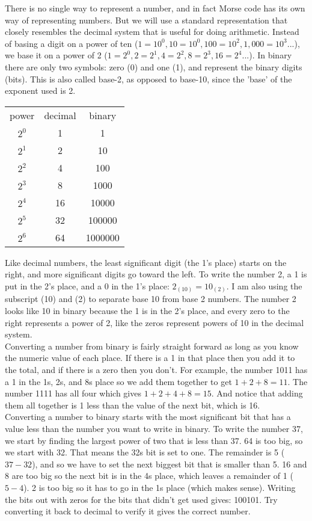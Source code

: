 There is no single way to represent a number, and in fact Morse code has its own way of representing numbers. But we will use a standard representation that closely resembles the decimal system that is useful for doing arithmetic. Instead of basing a digit on a power of ten ($1=10^0, 10=10^0, 100=10^2, 1,000=10^3...$), we base it on a power of 2 ($1=2^0, 2=2^1, 4=2^2, 8=2^3, 16=2^4...$). In binary there are only two symbols: zero (0) and one (1), and represent the binary digits (bits). This is also called base-2, as opposed to base-10, since the 'base' of the exponent used is 2.\\

\begin{center}
\begin{tabular}{c | c | c}
	power & decimal & binary \\
	$2^0$ & 1 & 1 \\
	$2^1$ & 2 & 10 \\
	$2^2$ & 4 & 100 \\
	$2^3$ & 8 & 1000 \\
	$2^4$ & 16 & 10000 \\
	$2^5$ & 32 & 100000 \\
	$2^6$ & 64 & 1000000 \\
\end{tabular}
\end{center}

Like decimal numbers, the least significant digit (the 1's place) starts on the right, and more significant digits go toward the left. To write the number 2, a 1 is put in the 2's place, and a 0 in the 1's place: $2_{(10)} = 10_{(2)}$. I am also using the subscript (10) and (2) to separate base 10 from base 2 numbers. The number 2 looks like 10 in binary because the 1 is in the 2's place, and every zero to the right represents a power of 2, like the zeros represent powers of 10 in the decimal system.\\

Converting a number from binary is fairly straight forward as long as you know the numeric value of each place. If there is a 1 in that place then you add it to the total, and if there is a zero then you don't. For example, the number 1011 has a 1 in the 1s, 2s, and 8s place so we add them together to get $1+2+8=11$. The number 1111 has all four which gives $1+2+4+8 = 15$. And notice that adding them all together is 1 less than the value of the next bit, which is 16.\\

Converting a number to binary starts with the most significant bit that has a value less than the number you want to write in binary. To write the number 37, we start by finding the largest power of two that is less than 37. 64 is too big, so we start with 32. That means the 32s bit is set to one. The remainder is 5 ($37-32$), and so we have to set the next biggest bit that is smaller than 5. 16 and 8 are too big so the next bit is in the 4s place, which leaves a remainder of 1 ($5-4$). 2 is too big so it has to go in the 1s place (which makes sense). Writing the bits out with zeros for the bits that didn't get used gives: 100101. Try converting it back to decimal to verify it gives the correct number.\\

